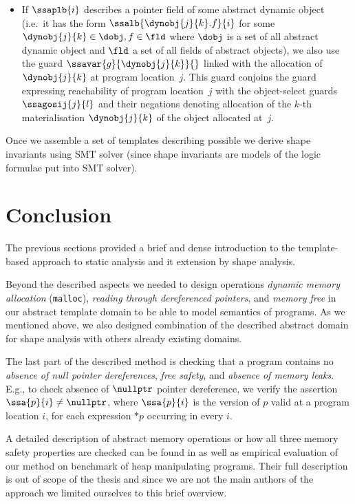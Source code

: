 {\begin{itemize}
  \item If $\ssaplb{i}$ describes a pointer field of some abstract
    dynamic object (i.e.\ it has the form $\ssalb{\dynobj{j}{k}.f}{i}$
    for some $\dynobj{j}{k} \in \dobj, f \in \fld$ where $\dobj$ is a set of all abstract dynamic object
    and $\fld$ a set of all fields of abstract objects), we also use the
    guard $\ssavar{g}{\dynobj{j}{k}}{}$ linked with the allocation of
    $\dynobj{j}{k}$ at program location~$j$. This guard conjoins the
    guard expressing reachability of program location~$j$ with the
    object-select guards $\ssagosij{j}{l}$ and their negations
    denoting allocation of the $k$-th materialisation $\dynobj{j}{k}$ of the
    object allocated at~$j$.
\end{itemize}

Once we assemble a set of templates describing possible we derive shape invariants
using SMT solver (since shape invariants are models of the logic formulae put into
SMT solver).

\section{Conclusion}
The previous sections provided a brief and dense introduction to the template-based
approach to static analysis and it extension by shape analysis.

Beyond the described aspects we needed to design operations \emph{dynamic memory allocation}
(\texttt{malloc}), \emph{reading through dereferenced pointers}, and \emph{memory free} in
our abstract template domain to be able to model semantics of programs.
As we mentioned above, we also designed combination of the described abstract domain
for shape analysis with others already existing domains.

The last part of the described method is checking that
a program contains no \emph{absence of null pointer dereferences},
\emph{free safety}, and \emph{absence of memory leaks}.
E.g., to check absence of $\nullptr$ pointer dereference, we verify the assertion
$\ssa{p}{i} \neq \nullptr$, where $\ssa{p}{i}$ is the version of $p$
valid at a program location $i$, for each expression $*p$ occurring in every $i$.

A detailed description of abstract memory operations or how all three memory safety properties are checked
can be found in \cite{fmcad18} as well as empirical evaluation of our
method on benchmark of heap manipulating programs.
Their full description is out of scope of the thesis and since
we are not the main authors of the approach we limited ourselves to this brief overview.

}
